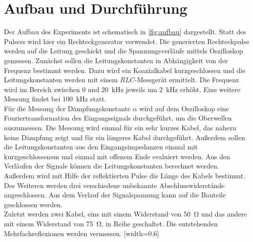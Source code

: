 \section {Aufbau und Durchführung}
\label{sec:durchführung}
Der Aufbau des Experiments ist schematisch in \autoref{fig:aufbau} dargestellt. Statt des Pulsers wird hier ein Rechteckgenerator verwendet. Die generierten Rechteckpulse werden auf die Leitung geschickt und die Spannungsverläufe mittels Oszilloskop gemessen.
Zunächst sollen die Leitungskonstanten in Abhängigkeit von der Frequenz bestimmt werden. Dazu wird ein Koaxialkabel kurzgeschlossen und die Leitungskonstanten werden mit einem $RLC$-Messgerät ermittelt. Die Frequenz wird im Bereich zwischen 0 und \SI{20}{\kilo\hertz} jeweils um \SI{2}{\kilo\hertz} erhöht. Eine weitere Messung findet bei \SI{100}{\kilo\hertz} statt. \\
Für die Messung der Dämpfungskonstante $\alpha$ wird auf dem Oszilloskop eine Fouriertransformation des Eingangssignals durchgeführt, um die Oberwellen auszumessen. Die Messung wird einmal für ein sehr kurzes Kabel, das nahezu keine Dämpfung zeigt und für ein längeres Kabel durchgeführt.
Außerdem sollen die Leitungskonstanten aus den Eingangsimpedanzen einmal mit kurzgeschlossenem und einmal mit offenem Ende evaluiert werden. Aus den Verläufen der Signale können die Leitungskonstanten berechnet werden. Außerdem wird mit Hilfe der reflektierten Pulse die Länge des Kabels bestimmt.\\
Des Weiteren werden drei verschiedene unbekannte Abschlusswiderstände angeschlossen. Aus dem Verlauf der Signalspannung kann auf die Bauteile geschlossen werden.\\
Zuletzt werden zwei Kabel, eins mit einem Widerstand von \SI{50}{\ohm} und das andere mit einem Widerstand von \SI{75}{\ohm}, in Reihe geschaltet. Die entstehenden Mehrfachreflexionen werden vermessen.
[width=0.6\textwidth]

